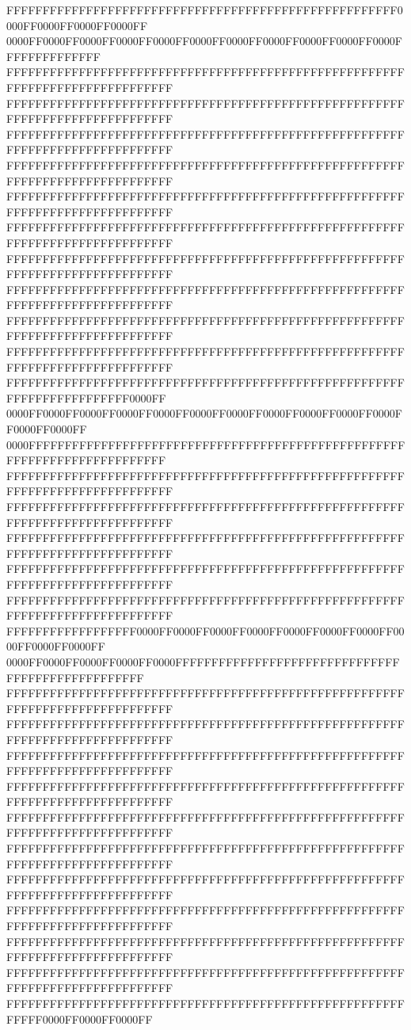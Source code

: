 FFFFFFFFFFFFFFFFFFFFFFFFFFFFFFFFFFFFFFFFFFFFFFFFFFFFFF0000FF0000FF0000FF0000FF
0000FF0000FF0000FF0000FF0000FF0000FF0000FF0000FF0000FF0000FF0000FFFFFFFFFFFFFF
FFFFFFFFFFFFFFFFFFFFFFFFFFFFFFFFFFFFFFFFFFFFFFFFFFFFFFFFFFFFFFFFFFFFFFFFFFFFFF
FFFFFFFFFFFFFFFFFFFFFFFFFFFFFFFFFFFFFFFFFFFFFFFFFFFFFFFFFFFFFFFFFFFFFFFFFFFFFF
FFFFFFFFFFFFFFFFFFFFFFFFFFFFFFFFFFFFFFFFFFFFFFFFFFFFFFFFFFFFFFFFFFFFFFFFFFFFFF
FFFFFFFFFFFFFFFFFFFFFFFFFFFFFFFFFFFFFFFFFFFFFFFFFFFFFFFFFFFFFFFFFFFFFFFFFFFFFF
FFFFFFFFFFFFFFFFFFFFFFFFFFFFFFFFFFFFFFFFFFFFFFFFFFFFFFFFFFFFFFFFFFFFFFFFFFFFFF
FFFFFFFFFFFFFFFFFFFFFFFFFFFFFFFFFFFFFFFFFFFFFFFFFFFFFFFFFFFFFFFFFFFFFFFFFFFFFF
FFFFFFFFFFFFFFFFFFFFFFFFFFFFFFFFFFFFFFFFFFFFFFFFFFFFFFFFFFFFFFFFFFFFFFFFFFFFFF
FFFFFFFFFFFFFFFFFFFFFFFFFFFFFFFFFFFFFFFFFFFFFFFFFFFFFFFFFFFFFFFFFFFFFFFFFFFFFF
FFFFFFFFFFFFFFFFFFFFFFFFFFFFFFFFFFFFFFFFFFFFFFFFFFFFFFFFFFFFFFFFFFFFFFFFFFFFFF
FFFFFFFFFFFFFFFFFFFFFFFFFFFFFFFFFFFFFFFFFFFFFFFFFFFFFFFFFFFFFFFFFFFFFFFFFFFFFF
FFFFFFFFFFFFFFFFFFFFFFFFFFFFFFFFFFFFFFFFFFFFFFFFFFFFFFFFFFFFFFFFFFFFFFFF0000FF
0000FF0000FF0000FF0000FF0000FF0000FF0000FF0000FF0000FF0000FF0000FF0000FF0000FF
0000FFFFFFFFFFFFFFFFFFFFFFFFFFFFFFFFFFFFFFFFFFFFFFFFFFFFFFFFFFFFFFFFFFFFFFFFFF
FFFFFFFFFFFFFFFFFFFFFFFFFFFFFFFFFFFFFFFFFFFFFFFFFFFFFFFFFFFFFFFFFFFFFFFFFFFFFF
FFFFFFFFFFFFFFFFFFFFFFFFFFFFFFFFFFFFFFFFFFFFFFFFFFFFFFFFFFFFFFFFFFFFFFFFFFFFFF
FFFFFFFFFFFFFFFFFFFFFFFFFFFFFFFFFFFFFFFFFFFFFFFFFFFFFFFFFFFFFFFFFFFFFFFFFFFFFF
FFFFFFFFFFFFFFFFFFFFFFFFFFFFFFFFFFFFFFFFFFFFFFFFFFFFFFFFFFFFFFFFFFFFFFFFFFFFFF
FFFFFFFFFFFFFFFFFFFFFFFFFFFFFFFFFFFFFFFFFFFFFFFFFFFFFFFFFFFFFFFFFFFFFFFFFFFFFF
FFFFFFFFFFFFFFFFFF0000FF0000FF0000FF0000FF0000FF0000FF0000FF0000FF0000FF0000FF
0000FF0000FF0000FF0000FF0000FFFFFFFFFFFFFFFFFFFFFFFFFFFFFFFFFFFFFFFFFFFFFFFFFF
FFFFFFFFFFFFFFFFFFFFFFFFFFFFFFFFFFFFFFFFFFFFFFFFFFFFFFFFFFFFFFFFFFFFFFFFFFFFFF
FFFFFFFFFFFFFFFFFFFFFFFFFFFFFFFFFFFFFFFFFFFFFFFFFFFFFFFFFFFFFFFFFFFFFFFFFFFFFF
FFFFFFFFFFFFFFFFFFFFFFFFFFFFFFFFFFFFFFFFFFFFFFFFFFFFFFFFFFFFFFFFFFFFFFFFFFFFFF
FFFFFFFFFFFFFFFFFFFFFFFFFFFFFFFFFFFFFFFFFFFFFFFFFFFFFFFFFFFFFFFFFFFFFFFFFFFFFF
FFFFFFFFFFFFFFFFFFFFFFFFFFFFFFFFFFFFFFFFFFFFFFFFFFFFFFFFFFFFFFFFFFFFFFFFFFFFFF
FFFFFFFFFFFFFFFFFFFFFFFFFFFFFFFFFFFFFFFFFFFFFFFFFFFFFFFFFFFFFFFFFFFFFFFFFFFFFF
FFFFFFFFFFFFFFFFFFFFFFFFFFFFFFFFFFFFFFFFFFFFFFFFFFFFFFFFFFFFFFFFFFFFFFFFFFFFFF
FFFFFFFFFFFFFFFFFFFFFFFFFFFFFFFFFFFFFFFFFFFFFFFFFFFFFFFFFFFFFFFFFFFFFFFFFFFFFF
FFFFFFFFFFFFFFFFFFFFFFFFFFFFFFFFFFFFFFFFFFFFFFFFFFFFFFFFFFFFFFFFFFFFFFFFFFFFFF
FFFFFFFFFFFFFFFFFFFFFFFFFFFFFFFFFFFFFFFFFFFFFFFFFFFFFFFFFFFFFFFFFFFFFFFFFFFFFF
FFFFFFFFFFFFFFFFFFFFFFFFFFFFFFFFFFFFFFFFFFFFFFFFFFFFFFFFFFFF0000FF0000FF0000FF
